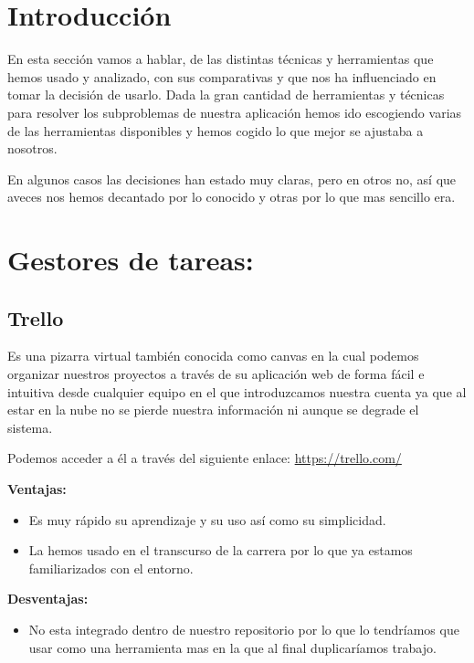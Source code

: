 
\section{Introducción}
En esta sección vamos a hablar, de las distintas técnicas y herramientas que hemos usado y analizado, con sus comparativas y que nos ha influenciado en tomar la decisión de usarlo.
Dada la gran cantidad de herramientas y técnicas para resolver los subproblemas de nuestra aplicación hemos ido escogiendo varias de las herramientas disponibles y hemos cogido lo que mejor se ajustaba a nosotros.

En algunos casos las decisiones han estado muy claras, pero en otros no, así que aveces nos hemos decantado por lo conocido y otras por lo que mas sencillo era.

\section{Gestores de tareas:}
\subsection{Trello}
Es una pizarra virtual también conocida como canvas en la cual podemos organizar nuestros proyectos a través de su aplicación web de forma fácil e intuitiva desde cualquier equipo en el que introduzcamos nuestra cuenta ya que al estar en la nube no se pierde nuestra información ni aunque se degrade el sistema.

Podemos acceder a él a través del siguiente enlace: 
\url{https://trello.com/}



\textbf{Ventajas:}

\begin{itemize}
\item Es muy rápido su aprendizaje y su uso así como su simplicidad.

\item La hemos usado en el transcurso de la carrera por lo que ya estamos familiarizados con el entorno.
\end{itemize}

\textbf{Desventajas:}

\begin{itemize}
\item No esta integrado dentro de nuestro repositorio por lo que lo tendríamos que usar como una herramienta mas en la que al final duplicaríamos trabajo.
\end{itemize}


